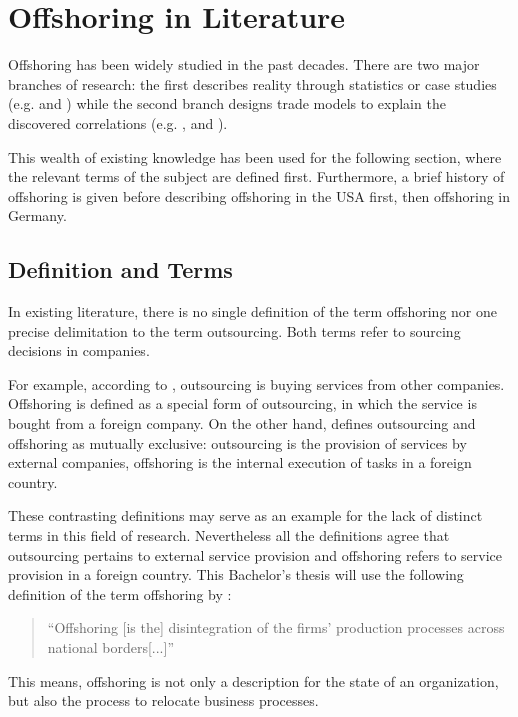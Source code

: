 \section{Offshoring in Literature}
Offshoring has been widely studied in the past decades. There are two major branches of research: the first describes reality through statistics or case studies (e.g. \cite{Rottman.2008} and \cite{Pedersen.2013}) while the second branch designs trade models to explain the discovered correlations (e.g. \cite{Antras.2004}, \cite{Grossman.2008} and \cite{Helpman.1999}).

This wealth of existing knowledge has been used for the following section, where the relevant terms of the subject are defined first. Furthermore, a brief history of offshoring is given before describing offshoring in the USA first, then offshoring in Germany.

\subsection{Definition and Terms}
In existing literature, there is no single definition of the term offshoring nor one precise delimitation to the term outsourcing. Both terms refer to sourcing decisions in companies. 

For example, according to \cite[pp. 1f]{Knolmayer.2007}, outsourcing is buying services from other companies. Offshoring is defined as a special form of outsourcing, in which the service is bought from a foreign company. On the other hand, \cite[p. 2]{Alebrand.2013} defines outsourcing and offshoring as mutually exclusive: outsourcing is the provision of services by external companies, offshoring is the internal execution of tasks in a foreign country.

These contrasting definitions may serve as an example for the lack of distinct terms in this field of research. Nevertheless all the definitions agree that outsourcing pertains to external service provision and offshoring refers to service provision in a foreign country. This Bachelor's thesis will use the following definition of the term offshoring by \cite[p. 321]{Andersson.2016}:

\begin{quote}
	``Offshoring [is the] disintegration of the firms’ production processes across national borders[...]''
\end{quote} 

This means, offshoring is not only a description for the state of an organization, but also the process to relocate business processes.

